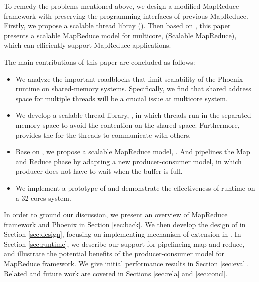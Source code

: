 
To remedy the problems mentioned above, we design a modified MapReduce framework with preserving the programming interfaces of previous MapReduce.
Firstly, we propose a scalable thread libray (\myth).
Then based on \myth, this paper presents a scalable MapReduce model for multicore, \myds(Scalable MapReduce), which can efficiently support MapReduce applications.

The main contributions of this paper are concluded as follows:
\begin{itemize}
  \item We analyze the important roadblocks that limit scalability of the Phoenix runtime on shared-memory systems. Specifically, we find that shared address space for multiple threads will be a crucial issue at multicore system.
  
  \item We develop a scalable thread library, \myth, in which threads run in  the separated memory space to avoid the contention on the shared space. Furthermore, \myth provides the  for the threads to communicate with others. 

  \item Base on \myth, we propose a scalable MapReduce model, \myds.
  And \myds pipelines the Map and Reduce phase by adapting a new producer-consumer model, in which producer does not have to wait when the buffer is full. 

  \item We implement a prototype of \myth and demonstrate the effectiveness of \myds runtime on a 32-cores system. 
\end{itemize}

In order to ground our discussion, we present an overview of MapReduce framework and Phoenix in Section \ref{sec:back}. 
We then develop the design of \myth in Section \ref{sec:design}, focusing on implementing mechanism of extension in \myth. 
In Section \ref{sec:runtime}, we describe our support for pipelineing map and reduce, and illustrate the potential benefits of the producer-consumer model for MapReduce framework.
We give initial performance results in Section \ref{sec:eval}. 
Related and future work are covered in Sections \ref{sec:rela} and \ref{sec:concl}.

